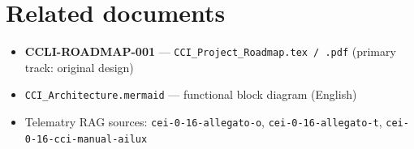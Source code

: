 \documentclass[11pt,a4paper]{article}
\newcommand{\file}[1]{\texttt{#1}}
\newcommand{\docref}[1]{\textbf{#1}}
\begin{document}
\section{Related documents}

\begin{itemize}[noitemsep]
  \item \docref{CCLI-ROADMAP-001} --- \file{CCI\_Project\_Roadmap.tex / .pdf} (primary track: original design)
  \item \file{CCI\_Architecture.mermaid} --- functional block diagram (English)
  \item Telematry RAG sources: \file{cei-0-16-allegato-o}, \file{cei-0-16-allegato-t}, \file{cei-0-16-cci-manual-ailux}
\end{itemize}
\end{document}
